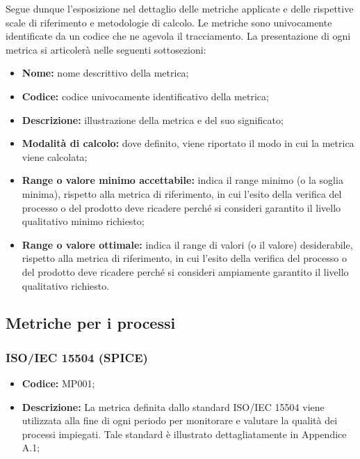 \documentclass[../NormediProgetto.tex]{subfiles}
\begin{document}
Segue dunque l'esposizione nel dettaglio delle metriche applicate e delle rispettive scale di riferimento e metodologie di calcolo. Le metriche sono univocamente identificate da un codice che ne agevola il tracciamento. La presentazione di ogni metrica si articolerà nelle seguenti sottosezioni:

\begin{itemize}
	\item \textbf{Nome:} nome descrittivo della metrica;
	
	\item \textbf{Codice:} codice univocamente identificativo della metrica;
	
	\item \textbf{Descrizione:} illustrazione della metrica e del suo significato; 
	
	\item \textbf{Modalità di calcolo:} dove definito, viene riportato il modo in cui la metrica viene calcolata;
	
	\item \textbf{Range o valore minimo accettabile:} indica il range minimo (o la soglia minima), rispetto alla metrica di riferimento, in cui l'esito della verifica del processo o del prodotto deve ricadere perché si consideri garantito il livello qualitativo minimo richiesto;
	
	\item \textbf{Range o valore ottimale:} indica il range di valori (o il valore) desiderabile, rispetto alla metrica di riferimento, in cui l'esito della verifica del processo o del prodotto deve ricadere perché si consideri ampiamente garantito il livello qualitativo richiesto.
\end{itemize}



\subsection{Metriche per i processi}

\subsubsection{ISO/IEC 15504 (SPICE)}

\begin{itemize}
	\item \textbf{Codice:} MP001;
	\item \textbf{Descrizione:} La metrica definita dallo standard ISO/IEC 15504 viene utilizzata alla fine di ogni periodo per monitorare e valutare la qualità dei processi impiegati. Tale standard è illustrato dettagliatamente in Appendice A.1;
\end{itemize}
\end{document}
